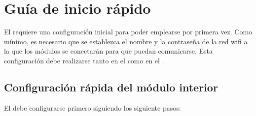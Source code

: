 \section{Guía de inicio rápido}
\label{sec:inicio-rapido}

El \CMS requiere una configuración inicial para poder emplearse por primera vez.
Como mínimo, es necesario que se establezca el nombre y la contraseña de la red wifi a la que los módulos se conectarán para que puedan comunicarse.
Esta configuración debe realizarse tanto en el \MIE como en el \MEE.

\subsection{Configuración rápida del módulo interior}

El \MIE debe configurarse primero siguiendo los siguiente pasos:

